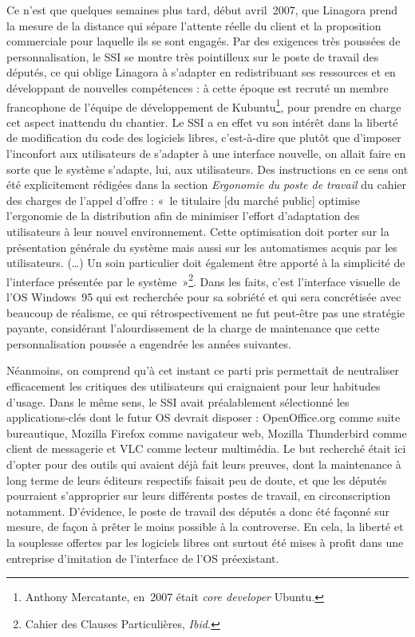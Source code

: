 \documentclass{FramateX}
\begin{document}
\begin{refsection}
Ce n'est que quelques semaines plus tard, début avril~2007, que Linagora
prend la mesure de la distance qui sépare l'attente réelle du client et
la proposition commerciale pour laquelle ils se sont engagés. Par des
exigences très poussées de personnalisation, le SSI se montre très
pointilleux sur le poste de travail des députés, ce qui oblige Linagora
à s'adapter en redistribuant ses ressources et en développant de
nouvelles compétences : à cette époque est recruté un membre
francophone de l'équipe de développement de Kubuntu\footnote{Anthony
Mercatante, en~2007 était \textit{core developer} Ubuntu.}, pour
prendre en charge cet aspect inattendu du chantier. Le SSI a en effet
vu son intérêt dans la liberté de modification du code des logiciels
libres, c'est-à-dire que plutôt que d'imposer l'inconfort aux
utilisateurs de s'adapter à une interface nouvelle, on allait faire en
sorte que le système s'adapte, lui, aux utilisateurs. Des instructions
en ce sens ont été explicitement rédigées dans la section
\textit{Ergonomie du poste de travail }du cahier des charges de l'appel
d'offre : «~le titulaire [du marché public] optimise l'ergonomie de la
distribution afin de minimiser l'effort d'adaptation des utilisateurs à
leur nouvel environnement. Cette optimisation doit porter sur la
présentation générale du système mais aussi sur les automatismes acquis
par les utilisateurs. (…) Un soin particulier doit également être
apporté à la simplicité de l'interface présentée par le
système~»\footnote{Cahier des Clauses Particulières, \textit{Ibid.}}.
Dans les faits, c'est l'interface visuelle de l'OS Windows~95 qui est
recherchée pour sa sobriété et qui sera concrétisée avec beaucoup de
réalisme, ce qui rétrospectivement ne fut peut-être pas une stratégie
payante, considérant l'alourdissement de la charge de maintenance que
cette personnalisation poussée a engendrée les années suivantes. 

Néanmoins, on comprend qu'à cet instant ce parti pris permettait de
neutraliser efficacement les critiques des utilisateurs qui craignaient
pour leur habitudes d'usage. Dans le même sens, le SSI avait
préalablement sélectionné les applications-clés dont le futur OS
devrait disposer : OpenOffice.org comme suite bureautique, Mozilla
Firefox comme navigateur web, Mozilla Thunderbird comme client de
messagerie et VLC comme lecteur multimédia. Le but recherché était ici
d'opter pour des outils qui avaient déjà fait leurs preuves, dont la
maintenance à long terme de leurs éditeurs respectifs faisait peu de
doute, et que les députés pourraient s'approprier sur leurs différents
postes de travail, en circonscription notamment. D'évidence, le poste
de travail des députés a donc été façonné sur mesure, de façon à prêter
le moins possible à la controverse. En cela, la liberté et la souplesse
offertes par les logiciels libres ont surtout été mises à profit dans
une entreprise d'imitation de l'interface de l'OS préexistant.


\end{refsection}
\end{document}
